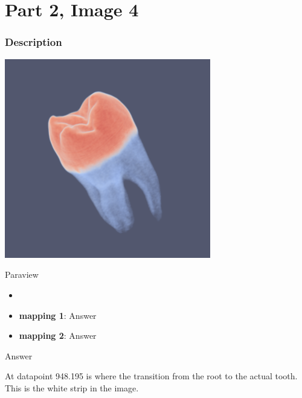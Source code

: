 \hypertarget{part-2-image-4}{%
\section{Part 2, Image 4}\label{part-1-design-2}}

\centering


\hypertarget{description}{%
	\subsubsection{Description}\label{description}}

\begin{description}
	\item[Image:]
	\item\includegraphics[width=9cm]{Tooth2.png}

	\item[Tool:]
	Paraview
	\item[Visual Mappings:]
	\begin{itemize}
		\tightlist
		\item[ ]
	\end{itemize}
	\begin{itemize}
		\tightlist
		\item
		\textbf{mapping 1}: Answer
	\end{itemize}
	
	\begin{itemize}
		\tightlist
		\item
		\textbf{mapping 2}: Answer
	\end{itemize}
	\item[Data Preparation:] Answer
	\item[Unique Observation:]
	At datapoint 948.195 is where the transition from the root to the actual tooth. This is the white strip in the image.
	
\end{description}